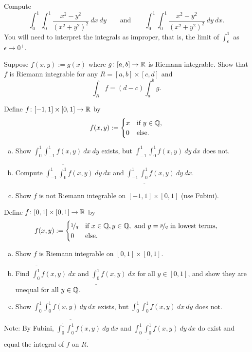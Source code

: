 \begin{exercise}
Compute
\begin{equation*}
\int_0^1 \int_0^1 \frac{x^2-y^2}{{(x^2+y^2)}^2} ~ dx ~ dy
\qquad \text{and} \qquad
\int_0^1 \int_0^1 \frac{x^2-y^2}{{(x^2+y^2)}^2} ~ dy ~ dx .
\end{equation*}
You will need to interpret the integrals as improper, that
is, the limit of $\int_\epsilon^1$ as $\epsilon \to 0^+$.
\end{exercise}

\begin{exercise}
Suppose $f(x,y) := g(x)$ where $g \colon [a,b] \to {\mathbb{R}}$ is Riemann integrable.
Show that $f$ is Riemann integrable for any $R = [a,b] \times [c,d]$ and 
\begin{equation*}
\int_R f = (d-c) \int_a^b g .
\end{equation*}
\end{exercise}

\begin{exercise}
Define $f \colon [-1,1] \times [0,1] \to {\mathbb{R}}$ by
\begin{equation*}
f(x,y) :=
\begin{cases}
x & \text{if } y \in {\mathbb{Q}}, \\
0 & \text{else.} 
\end{cases}
\end{equation*}
\begin{enumerate}[a)]
\item
Show
$\int_0^1 \int_{-1}^1 f(x,y) ~ dx ~ dy$ exists, but
$\int_{-1}^1 \int_0^1 f(x,y) ~ dy ~ dx$ does not.
\item
Compute
$\int_{-1}^1 \overline{\int_0^1} f(x,y) ~ dy ~ dx$ and
$\int_{-1}^1 \underline{\int_0^1} f(x,y) ~ dy ~ dx$.
\item
Show $f$ is not Riemann integrable on $[-1,1] \times [0,1]$ (use
Fubini).
\end{enumerate}
\end{exercise}

\begin{exercise}
Define $f \colon [0,1] \times [0,1] \to {\mathbb{R}}$ by
\begin{equation*}
f(x,y) :=
\begin{cases}
\nicefrac{1}{q} & \text{if } x \in {\mathbb{Q}}, y \in {\mathbb{Q}}, \text{ and }
  y=\nicefrac{p}{q} \text{ in lowest terms,} \\
0               & \text{else.} 
\end{cases}
\end{equation*}
\begin{enumerate}[a)]
\item
Show $f$ is Riemann integrable on $[0,1] \times [0,1]$.
\item
Find 
$\overline{\int_0^1} f(x,y) ~ dx$ and
$\underline{\int_0^1} f(x,y) ~ dx$ for all $y \in [0,1]$, and show they are unequal for all $y
\in {\mathbb{Q}}$.
\item
Show
$\int_0^1 \int_0^1 f(x,y) ~ dy ~ dx$ exists, but
   $\int_0^1 \int_0^1 f(x,y) ~ dx ~ dy$ does not.
\end{enumerate}
Note: By Fubini,
$\int_0^1 \overline{\int_0^1} f(x,y) ~ dy ~ dx$ and 
$\int_0^1 \underline{\int_0^1} f(x,y) ~ dy ~ dx$ do exist and equal the
integral of $f$ on $R$.
\end{exercise}

